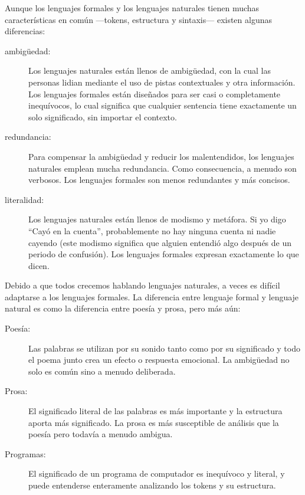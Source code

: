 \documentclass[10pt]{book}
\begin{document}
Aunque los lenguajes formales y los lenguajes naturales tienen muchas características en
común ---tokens, estructura y sintaxis--- existen algunas
diferencias:

\begin{description}

\item[ambigüedad:] Los lenguajes naturales están llenos de ambigüedad, con la cual
las personas lidian mediante el uso de pistas contextuales y otra información.
Los lenguajes formales están diseñados para ser casi o completamente inequívocos,
lo cual significa que cualquier sentencia tiene exactamente un solo significado,
sin importar el contexto.

\item[redundancia:] Para compensar la ambigüedad y reducir
los malentendidos, los lenguajes naturales emplean mucha
redundancia.  Como consecuencia, a menudo son verbosos.  Los lenguajes formales
son menos redundantes y más concisos.

\item[literalidad:] Los lenguajes naturales están llenos de modismo y metáfora.
Si yo digo ``Cayó en la cuenta'', probablemente no hay ninguna cuenta ni
nadie cayendo (este modismo significa que alguien entendió algo
después de un periodo de confusión).  Los lenguajes formales
expresan exactamente lo que dicen.

\end{description}

Debido a que todos crecemos hablando lenguajes naturales, a veces es
difícil adaptarse a los lenguajes formales.  La diferencia entre lenguaje formal
y lenguaje natural es como la diferencia entre poesía y prosa, pero
más aún:  

\begin{description}

\item[Poesía:] Las palabras se utilizan por su sonido tanto como por
su significado y todo el poema junto crea un efecto o
respuesta emocional.  La ambigüedad no solo es común sino a menudo
deliberada.

\item[Prosa:] El significado literal de las palabras es más importante
y la estructura aporta más significado.  La prosa es más susceptible de
análisis que la poesía pero todavía a menudo ambigua.

\item[Programas:] El significado de un programa de computador es inequívoco
y literal, y puede entenderse enteramente analizando los
tokens y su estructura.

\end{description}
\end{document}
